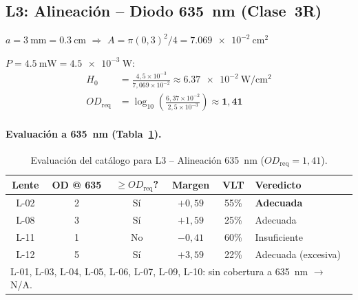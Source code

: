 \documentclass[12pt,a4paper]{article}
\begin{document}
\subsection{L3: Alineación -- Diodo 635~nm (Clase~3R)}

$a = \SI{3}{\mm} = \SI{0.3}{\cm}$ $\Rightarrow$
$A = \pi(0{,}3)^2/4 = \SI{7.069e-2}{\centi\metre\squared}$

$P = \SI{4.5}{\mW} = \SI{4.5e-3}{\watt}$:
\begin{align}
	H_0               & = \frac{4{,}5\times10^{-3}}{7{,}069\times10^{-2}}
	\approx \SI{6.37e-2}{\watt\per\centi\metre\squared}
	\label{eq:H0_L3}                                                                             \\
	OD_{\mathrm{req}} & = \log_{10}\!\left(\frac{6{,}37\times10^{-2}}{2{,}5\times10^{-3}}\right)
	\approx \mathbf{1{,}41}
	\label{eq:OD_L3}
\end{align}

\paragraph{Evaluación a 635~nm (Tabla~\ref{tab:eval_L3}).}

\begin{table}[H]
	\centering
	\caption{Evaluación del catálogo para L3 -- Alineación 635~nm ($OD_{\mathrm{req}} = 1{,}41$).}
	\label{tab:eval_L3}
	\small
	\begin{tabular}{c c c c c l}
		\toprule
		\textbf{Lente} & \textbf{OD @ 635} & \textbf{$\ge OD_{\mathrm{req}}$?}
		               & \textbf{Margen}   & \textbf{VLT}                      & \textbf{Veredicto}                                                     \\
		\midrule
		\rowcolor{aerogreen!15}
		L-02           & 2                 & Sí                                & $+0{,}59$          & 55\% & \textcolor{aerogreen}{\textbf{Adecuada}}   \\
		\rowcolor{aerogreen!15}
		L-08           & 3                 & Sí                                & $+1{,}59$          & 25\% & \textcolor{aerogreen}{Adecuada}            \\
		L-11           & 1                 & No                                & $-0{,}41$          & 60\% & \textcolor{aerored}{Insuficiente}          \\
		\rowcolor{aerogreen!15}
		L-12           & 5                 & Sí                                & $+3{,}59$          & 22\% & \textcolor{aerogreen}{Adecuada (excesiva)} \\
		\midrule
		\multicolumn{6}{l}{\footnotesize L-01, L-03, L-04, L-05, L-06, L-07, L-09, L-10: sin cobertura a 635~nm $\rightarrow$ N/A.}                     \\
		\bottomrule
	\end{tabular}
\end{table}
\end{document}
